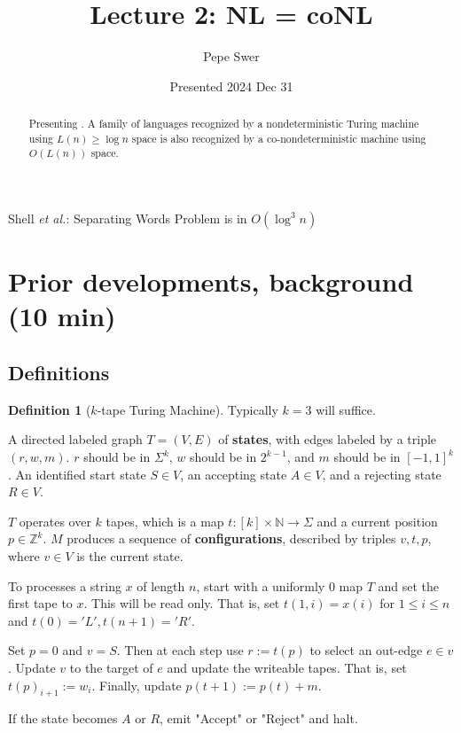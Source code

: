 \documentclass{article}
\theoremstyle{definition}
\newtheorem{definition}{Definition}
\theoremstyle{example}
\theoremstyle{plain}
\theoremstyle{plain}
\theoremstyle{definition}
\begin{document}
\title{Lecture 2: NL = coNL}%
\author{Pepe Swer}%
\date{Presented 2024 Dec 31}



%
{Shell \MakeLowercase{\textit{et al.}}: Separating Words Problem is in $O(\log^3n)$}
% 



\maketitle
\thispagestyle{empty}


\begin{abstract}
Presenting \cite{KK}. A family of languages recognized by a nondeterministic Turing machine using $L(n) \ge \log n$ space is also recognized by a co-nondeterministic machine using $O(L(n))$ space.
\end{abstract}


\section{Prior developments, background (10 min)}
\subsection{Definitions}

\begin{definition}[$k$-tape Turing Machine]
Typically $k=3$ will suffice.

A directed labeled graph $T = (V, E)$ of \textbf{states}, with edges labeled by a triple $(r, w, m)$. $r$ should be in $\Sigma^k$, $w$ should be in $2^{k-1}$, and $m$ should be in $[-1, 1]^k$. An identified start state $S \in V$, an accepting state $A \in V$, and a rejecting state $R \in V$.

$T$ operates over $k$ tapes, which is a map $t: [k] \times \mathbb{N} \rightarrow \Sigma$ and a current position $p \in \mathbb{Z}^k$. $M$ produces a sequence of \textbf{configurations}, described by triples $v, t, p$, where $v \in V$ is the current state.

To processes a string $x$ of length $n$, start with a uniformly 0 map $T$ and set the first tape to $x$. This will be read only. That is, set $t(1, i) = x(i)$ for $1 \le i \le n$ and $t(0) = 'L', t(n+1) = 'R'$.

Set $p = 0$ and $v = S$. Then at each step use $r := t(p)$ to select an out-edge $e \in v$. Update $v$ to the target of $e$ and update the writeable tapes. That is, set $t(p)_{i+1} := w_i$. Finally, update $p(t + 1) := p(t) + m$.

If the state becomes $A$ or $R$, emit "Accept" or "Reject" and halt.
\end{definition}
\end{document}
